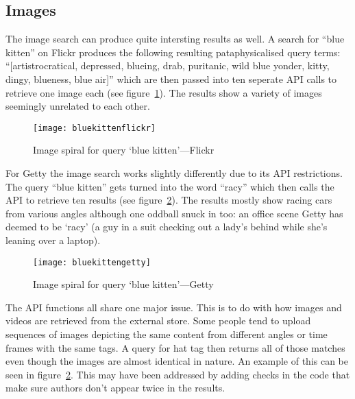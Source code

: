 

\subsection{Images}

The image search can produce quite intersting results as well. A search for ``blue kitten'' on Flickr produces the following resulting pataphysicalised query terms: ``[artistrocratical, depressed, blueing, drab, puritanic, wild blue yonder, kitty, dingy, blueness, blue air]'' which are then passed into ten seperate \ac{API} calls to retrieve one image each (see figure~\ref{fig:imgspiralflickr}). The results show a variety of images seemingly unrelated to each other. 

\begin{figure}[!htbp]
\centering
  \texttt{[image: bluekittenflickr]}
\caption[Image spiral `blue kitten'---Flickr]{Image spiral for query `blue kitten'---Flickr}
\label{fig:imgspiralflickr}
\end{figure}

For Getty the image search works slightly differently due to its \ac{API} restrictions. The query ``blue kitten'' gets turned into the word ``racy'' which then calls the \ac{API} to retrieve ten results (see figure~\ref{fig:imgspiralgetty}). The results mostly show racing cars from various angles although one oddball snuck in too: an office scene Getty has deemed to be `racy' (a guy in a suit checking out a lady's behind while she's leaning over a laptop).

\begin{figure}[!htbp]
\centering
  \texttt{[image: bluekittengetty]}
\caption[Image spiral `blue kitten'---Getty]{Image spiral for query `blue kitten'---Getty}
\label{fig:imgspiralgetty}
\end{figure}

\spirals

The \ac{API} functions all share one major issue. This is to do with how images and videos are retrieved from the external store. Some people tend to upload sequences of images depicting the same content from different angles or time frames with the same tags. A query for hat tag then returns all of those matches even though the images are almost identical in nature. An example of this can be seen in figure~\ref{fig:imgspiralgetty}. This may have been addressed by adding checks in the code that make sure authors don't appear twice in the results.

